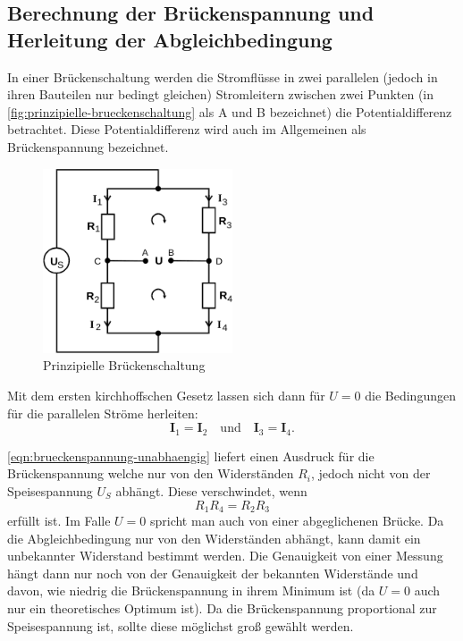 \subsection{Berechnung der Brückenspannung und Herleitung der 
Abgleichbedingung}
\label{eqn:abgleichbedingung}

In einer Brückenschaltung werden die Stromflüsse in zwei parallelen (jedoch in ihren
Bauteilen nur bedingt gleichen) Stromleitern zwischen zwei Punkten (in 
\autoref{fig:prinzipielle-brueckenschaltung} als A und B bezeichnet) die Potentialdifferenz 
betrachtet.
Diese Potentialdifferenz wird auch im Allgemeinen als Brückenspannung bezeichnet.

\begin{figure}[H]
	\centering
	\includegraphics[width=0.5\textwidth]{bilder/prinzipielle-brueckenschaltung.png}
	\caption{Prinzipielle Brückenschaltung}
	\label{fig:prinzipielle-brueckenschaltung}
\end{figure}

Mit dem ersten kirchhoffschen Gesetz lassen sich dann für $U=0$ die Bedingungen für
die parallelen Ströme herleiten:
\begin{equation}
	\mathbf{I}_1 = \mathbf{I}_2
	\quad \text{und} \quad
	\mathbf{I}_3 = \mathbf{I}_4.
	\label{eqn:brueckenschaltung-stroeme}
\end{equation}


\autoref{eqn:brueckenspannung-unabhaengig} liefert einen Ausdruck für die Brückenspannung
welche nur von den Widerständen $R_i$, jedoch nicht von der Speisespannung $U_S$ abhängt.
Diese verschwindet, wenn
\begin{equation}
	R_1R_4 = R_2R_3
	\label{eqn:prinzipielle-abgleichbedingung}
\end{equation}
erfüllt ist. Im Falle $U=0$ spricht man auch von einer abgeglichenen Brücke. Da die 
Abgleichbedingung nur von den Widerständen abhängt, kann damit ein unbekannter Widerstand
bestimmt werden. Die Genauigkeit von einer Messung hängt dann nur noch von der Genauigkeit
der bekannten Widerstände und davon, wie niedrig die Brückenspannung in ihrem Minimum ist
(da $U=0$ auch nur ein theoretisches Optimum ist).
Da die Brückenspannung proportional zur Speisespannung ist, sollte diese möglichst
groß gewählt werden.

